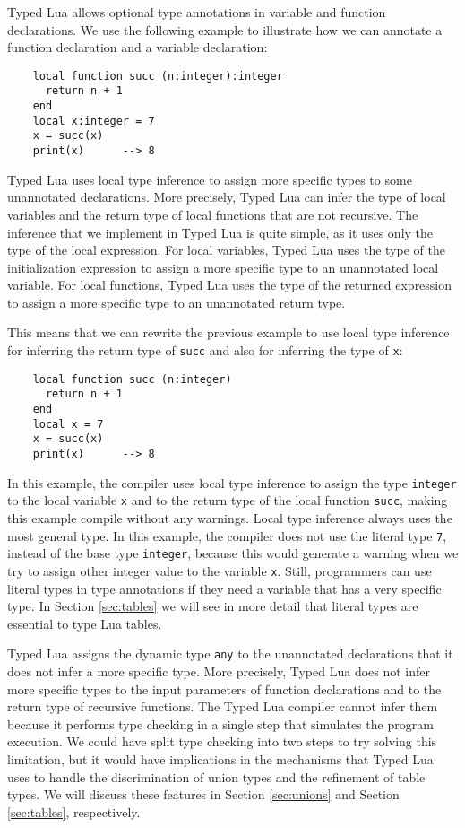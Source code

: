 Typed Lua allows optional type annotations in variable and function
declarations.
We use the following example to illustrate how we can annotate a
function declaration and a variable declaration:
\begin{verbatim}
    local function succ (n:integer):integer
      return n + 1
    end
    local x:integer = 7
    x = succ(x)
    print(x)      --> 8
\end{verbatim}

Typed Lua uses local type inference to assign more specific types to
some unannotated declarations.
More precisely, Typed Lua can infer the type of local variables and
the return type of local functions that are not recursive.
The inference that we implement in Typed Lua is quite simple, as it
uses only the type of the local expression.
For local variables, Typed Lua uses the type of the initialization
expression to assign a more specific type to an unannotated local variable.
For local functions, Typed Lua uses the type of the returned expression
to assign a more specific type to an unannotated return type.

This means that we can rewrite the previous example to use local type
inference for inferring the return type of \texttt{succ} and also for
inferring the type of \texttt{x}:
\begin{verbatim}
    local function succ (n:integer)
      return n + 1
    end
    local x = 7
    x = succ(x)
    print(x)      --> 8
\end{verbatim}

In this example, the compiler uses local type inference to assign the
type \texttt{integer} to the local variable \texttt{x} and to the
return type of the local function \texttt{succ}, making this example
compile without any warnings.
Local type inference always uses the most general type.
In this example, the compiler does not use the literal type \texttt{7},
instead of the base type \texttt{integer}, because this would generate
a warning when we try to assign other integer value to the variable \texttt{x}.
Still, programmers can use literal types in type annotations if
they need a variable that has a very specific type.
In Section \ref{sec:tables} we will see in more detail that literal types
are essential to type Lua tables.

Typed Lua assigns the dynamic type \texttt{any} to the unannotated declarations
that it does not infer a more specific type.
More precisely, Typed Lua does not infer more specific types to the input
parameters of function declarations and to the return type of
recursive functions.
The Typed Lua compiler cannot infer them because it performs type checking in
a single step that simulates the program execution.
We could have split type checking into two steps to try solving this
limitation, but it would have implications in the mechanisms
that Typed Lua uses to handle the discrimination of union types
and the refinement of table types.
We will discuss these features in Section \ref{sec:unions} and
Section \ref{sec:tables}, respectively.

